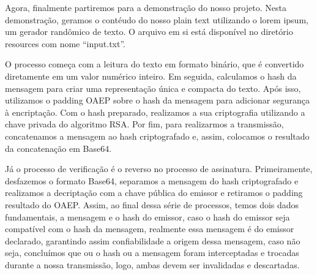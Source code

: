 \documentclass[11pt]{article}
\begin{document}
Agora, finalmente partiremos para a demonstração do nosso projeto. Nesta
demonstração, geramos o contéudo do nosso plain text utilizando o lorem
ipsum, um gerador randômico de texto. O arquivo em si está disponível no
diretório resources com nome ``input.txt''.

O processo começa com a leitura do texto em formato binário, que é
convertido diretamente em um valor numérico inteiro. Em seguida,
calculamos o hash da mensagem para criar uma representação única e
compacta do texto. Após isso, utilizamos o padding OAEP sobre o hash da
mensagem para adicionar segurança à encriptação. Com o hash preparado,
realizamos a sua criptografia utilizando a chave privada do algoritmo
RSA. Por fim, para realizarmos a transmissão, concatenamos a mensagem ao
hash criptografado e, assim, colocamos o resultado da concatenação em
Base64.

Já o processo de verificação é o reverso no processo de assinatura.
Primeiramente, desfazemos o formato Base64, separamos a mensagem do hash
criptografado e realizamos a decriptação com a chave pública do emissor
e retiramos o padding resultado do OAEP. Assim, ao final dessa série de
processos, temos dois dados fundamentais, a mensagem e o hash do
emissor, caso o hash do emissor seja compatível com o hash da mensagem,
realmente essa mensagem é do emissor declarado, garantindo assim
confiabilidade a origem dessa mensagem, caso não seja, concluímos que ou
o hash ou a mensagem foram interceptadas e trocadas durante a nossa
transmissão, logo, ambas devem ser invalidadas e descartadas.
\end{document}
